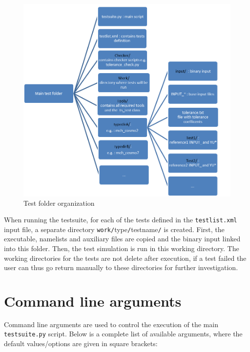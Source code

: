 \documentclass[12pt,twoside,a4paper]{report}
\begin{document}
\begin{figure}[hbt]
\begin{center}
\includegraphics[width=0.7\linewidth]{fig_structure}%
\caption{Test folder organization \label{fig:structure}}
\end{center}
\end{figure}

When running the testsuite, for each of the tests defined in the \texttt{testlist.xml} input file, a separate directory \texttt{work/}type\texttt{/}testname\texttt{/} is created. First, the executable, namelists and auxiliary files are copied and the binary input linked into this folder. Then, the test simulation is run in this working directory. The working directories for the tests are not delete after execution, if a test failed the user can thus go return manually to these directories for further investigation.

\newpage
\section{Command line arguments}

Command line arguments are used to control the execution of the main \texttt{testsuite.py} script. Below is a complete list of available arguments, where the default values/options are given in square brackets:\\
\end{document}
